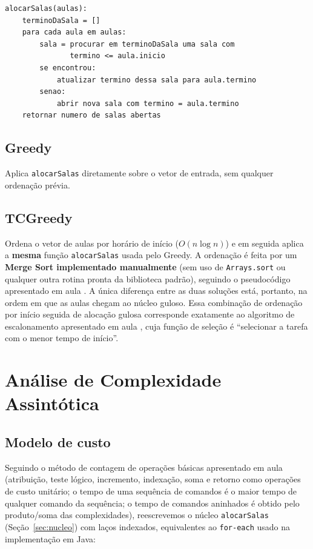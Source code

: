 \documentclass[12pt]{article}
\begin{document}
\begin{verbatim}
alocarSalas(aulas):
    terminoDaSala = []
    para cada aula em aulas:
        sala = procurar em terminoDaSala uma sala com
               termino <= aula.inicio
        se encontrou:
            atualizar termino dessa sala para aula.termino
        senao:
            abrir nova sala com termino = aula.termino
    retornar numero de salas abertas
\end{verbatim}

\subsection{Greedy}

Aplica \texttt{alocarSalas} diretamente sobre o vetor de entrada, sem
qualquer ordenação prévia.

\subsection{TCGreedy}

Ordena o vetor de aulas por horário de início ($O(n \log n)$) e em seguida
aplica a \textbf{mesma} função \texttt{alocarSalas} usada pelo Greedy. A
ordenação é feita por um \textbf{Merge Sort implementado manualmente}
(sem uso de \texttt{Arrays.sort} ou qualquer outra rotina pronta da
biblioteca padrão), seguindo o pseudocódigo apresentado em aula
\cite{brun:ordenacao}. A única diferença entre as duas soluções está,
portanto, na ordem em que as aulas chegam ao núcleo guloso. Essa
combinação de ordenação por início seguida de alocação gulosa corresponde
exatamente ao algoritmo de escalonamento apresentado em aula
\cite{brun:26}, cuja função de seleção é ``selecionar a tarefa com o menor
tempo de início''.

\section{Análise de Complexidade Assintótica}
\label{sec:complexidade}

\subsection{Modelo de custo}

Seguindo o método de contagem de operações básicas apresentado em aula
(atribuição, teste lógico, incremento, indexação, soma e retorno como
operações de custo unitário; o tempo de uma sequência de comandos é o
maior tempo de qualquer comando da sequência; o tempo de comandos
aninhados é obtido pelo produto/soma das complexidades), reescrevemos o
núcleo \texttt{alocarSalas} (Seção~\ref{sec:nucleo}) com laços indexados,
equivalentes ao \texttt{for-each} usado na implementação em Java:
\end{document}
